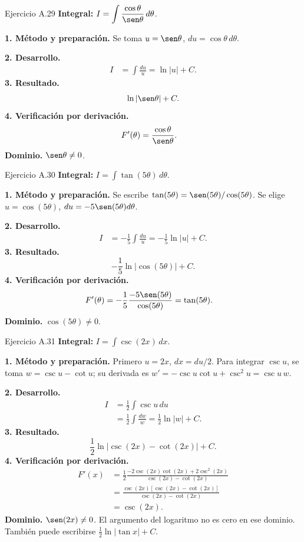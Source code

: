\begin{examplebox}{Ejercicio A.29}
\textbf{Integral:} $\displaystyle I=\int \frac{\cos\theta}{\sen\theta}\,d\theta$.

\textbf{1. Método y preparación.} Se toma $u=\sen\theta$, $du=\cos\theta\,d\theta$.

\textbf{2. Desarrollo.}
\begin{align*}
I&=\int\frac{du}{u}=\ln|u|+C.
\end{align*}
\textbf{3. Resultado.}
\[
\ln|\sen\theta|+C.
\]
\textbf{4. Verificación por derivación.}
\begin{align*}
F'(\theta)&=\frac{\cos\theta}{\sen\theta}.
\end{align*}
\textbf{Dominio.} $\sen\theta\ne0$.
\end{examplebox}

\begin{examplebox}{Ejercicio A.30}
\textbf{Integral:} $\displaystyle I=\int \tan(5\theta)\,d\theta$.

\textbf{1. Método y preparación.} Se escribe $\tan(5\theta)=\sen(5\theta)/\cos(5\theta)$. Se elige $u=\cos(5\theta)$, $du=-5\sen(5\theta)d\theta$.

\textbf{2. Desarrollo.}
\begin{align*}
I&=-\frac15\int\frac{du}{u}=-\frac15\ln|u|+C.
\end{align*}
\textbf{3. Resultado.}
\[
-\frac15\ln|\cos(5\theta)|+C.
\]
\textbf{4. Verificación por derivación.}
\begin{align*}
F'(\theta)&=-\frac15\frac{-5\sen(5\theta)}{\cos(5\theta)}=\tan(5\theta).
\end{align*}
\textbf{Dominio.} $\cos(5\theta)\ne0$.
\end{examplebox}

\begin{examplebox}{Ejercicio A.31}
\textbf{Integral:} $\displaystyle I=\int \csc(2x)\,dx$.

\textbf{1. Método y preparación.} Primero $u=2x$, $dx=du/2$. Para integrar $\csc u$, se toma $w=\csc u-\cot u$; su derivada es $w'=-\csc u\cot u+\csc^2u=\csc u\,w$.

\textbf{2. Desarrollo.}
\begin{align*}
I&=\frac12\int\csc u\,du\\&=\frac12\int\frac{dw}{w}=\frac12\ln|w|+C.
\end{align*}
\textbf{3. Resultado.}
\[
\frac12\ln|\csc(2x)-\cot(2x)|+C.
\]
\textbf{4. Verificación por derivación.}
\begin{align*}
F'(x)&=\frac12\frac{-2\csc(2x)\cot(2x)+2\csc^2(2x)}{\csc(2x)-\cot(2x)}\\&=\frac{\csc(2x)[\csc(2x)-\cot(2x)]}{\csc(2x)-\cot(2x)}\\&=\csc(2x).
\end{align*}
\textbf{Dominio.} $\sen(2x)\ne0$. El argumento del logaritmo no es cero en ese dominio. También puede escribirse $\tfrac12\ln|\tan x|+C$.
\end{examplebox}

